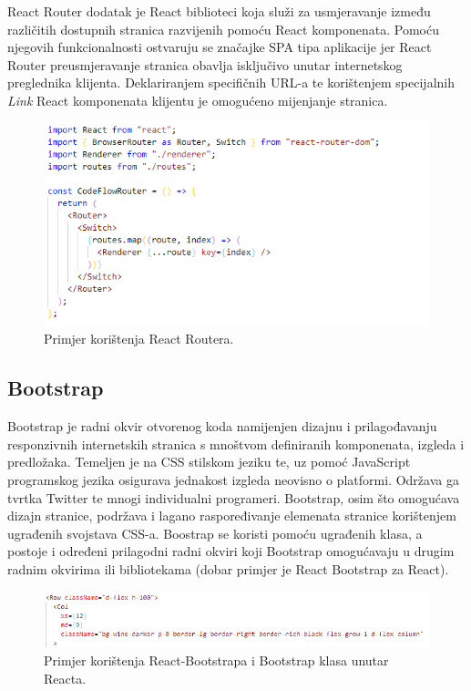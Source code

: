 \documentclass[times, utf8, zavrsni]{fer}
\begin{document}
			React Router dodatak je React biblioteci koja služi za usmjeravanje između različitih dostupnih  stranica razvijenih pomoću React komponenata. Pomoću njegovih funkcionalnosti ostvaruju se značajke SPA tipa aplikacije jer React Router preusmjeravanje stranica obavlja isključivo unutar internetskog preglednika klijenta. Deklariranjem specifičnih URL-a  te korištenjem specijalnih \textit{Link} React komponenata klijentu je omogućeno mijenjanje stranica.
			\begin{figure}[H]
				\centering
				\includegraphics[scale=0.75]{pictures/prikazi/ReactRouter.png}
				\caption{Primjer korištenja React Routera.}
				\label{fig:react-router}
			\end{figure}
			
			\subsection{Bootstrap}
			Bootstrap je radni okvir  otvorenog koda namijenjen dizajnu i prilagođavanju responzivnih internetskih stranica s mnoštvom definiranih komponenata, izgleda i predložaka. Temeljen je na CSS stilskom jeziku te, uz pomoć JavaScript programskog jezika osigurava jednakost izgleda neovisno o platformi. Održava ga tvrtka Twitter te mnogi individualni programeri. Bootstrap, osim što omogućava dizajn stranice, podržava i lagano raspoređivanje elemenata stranice korištenjem ugrađenih svojstava CSS-a. Boostrap se koristi pomoću ugrađenih klasa, a postoje i određeni prilagodni radni okviri koji Bootstrap omogućavaju u drugim radnim okvirima ili bibliotekama (dobar primjer je React Bootstrap za React).
			\begin{figure}[H]
				\centering
				\includegraphics[width=\linewidth]{pictures/prikazi/Bootstrap.png}
				\caption{Primjer korištenja React-Bootstrapa i Bootstrap klasa unutar Reacta.}
				\label{fig:bootstrap}
			\end{figure}
			
\end{document}
